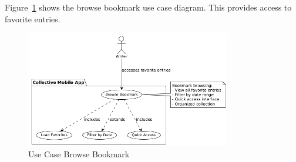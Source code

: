 Figure~\ref{fig:usecase-browse-bookmark} shows the browse bookmark use case diagram. This provides access to favorite entries.

\begin{figure}[H]
\centering
\includegraphics[width=0.8\textwidth]{files/imgs/usecase_U9ojaarlmZ.png}
\caption{Use Case Browse Bookmark}
\label{fig:usecase-browse-bookmark}
\end{figure}

